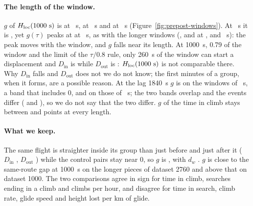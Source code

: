 \paragraph{The length of the window.} $g$ of $H_\mathrm{loc}(1000~\mathrm{s})$ is \PreWinBHK{} \PreWinBHKBand{} at \PreWinBLen~s, \PreWinCHK{} \PreWinCHKBand{} at \PreWinCLen~s and \PreWinDHK{} \PreWinDHKBand{} at \PreWinDLen~s (Figure~\ref{fig:prepost-windows}). At \PreWinALen~s it is \PreWinAHK{} \PreWinAHKBand, yet $g(\tau)$ peaks at \PreWinAPeak{} at \PreWinAPeakLag~s, as with the longer windows (\PreWinBPeak{}, \PreWinCPeak{} and \PreWinDPeak{} at \PreWinBPeakLag, \PreWinCPeakLag{} and \PreWinDPeakLag~s): the peak moves with the window, and $g$ falls near its length.
At 1000~s, 0.79 of the window and the limit of the $\tau/0.8$ rule, only 260~s of the window can start a displacement and $D_\text{in}$ is \PreWinADIn{} while $D_\text{out}$ is \PreWinADOut: $H_\mathrm{loc}(1000~\mathrm{s})$ is not comparable there. Why $D_\text{in}$ falls and $D_\text{out}$ does not we do not know; the first minutes of a group, when it forms, are a possible reason. At the lag 1840~s $g$ is \PreWinCHQ{} \PreWinCHQBand{} on the windows of \PreWinCLen~s, a band that includes 0, and \PreWinDHQ{} \PreWinDHQBand{} on those of \PreWinDLen~s; the two bands overlap and the events differ (\PreWinCEvents{} and \PreWinDEvents), so we do not say that the two differ. $g$ of the time in climb stays between \PreWinBClimb{} and \PreWinAClimb{} points at every length.

\paragraph{What we keep.} The same flight is straighter inside its group than just before and just after it ($D_\text{in}$ \PreInHK, $D_\text{out}$ \PreOutHK) while the control pairs stay near 0, so $g$ is \PreGHK{} \PreGHKBand, with $d_w$ \PreDwHK{} \PreDwHKBand. $g$ is close to the
same-route gap at 1000~s on the longer pieces of dataset 2760 and above that on dataset 1000. The two comparisons agree in sign for time in climb, searches ending in a climb and climbs per hour, and disagree for time in search, climb rate, glide speed and height lost per km of glide.

